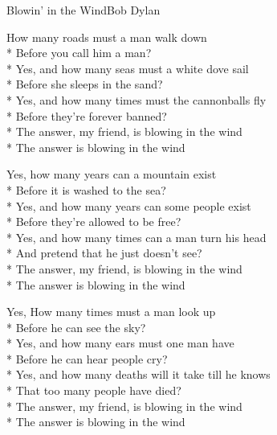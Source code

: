 \documentclass[10.5pt]{book}
\begin{document}
\begin{poem}{Blowin' in the Wind}{Bob Dylan}

\settowidth{\versewidth}{Yes, and how many times must the cannonballs fly}

How many roads must a man walk down\\*
Before you call him a man?\\*
Yes, and how many seas must a white dove sail\\*
Before she sleeps in the sand?\\*
Yes, and how many times must the cannonballs fly\\*
Before they're forever banned?\\*
The answer, my friend, is blowing in the wind\\*
The answer is blowing in the wind

Yes, how many years can a mountain exist\\*
Before it is washed to the sea?\\*
Yes, and how many years can some people exist\\*
Before they're allowed to be free?\\*
Yes, and how many times can a man turn his head\\*
And pretend that he just doesn't see?\\*
The answer, my friend, is blowing in the wind\\*
The answer is blowing in the wind

Yes, How many times must a man look up\\*
Before he can see the sky?\\*
Yes, and how many ears must one man have\\*
Before he can hear people cry?\\*
Yes, and how many deaths will it take till he knows\\*
That too many people have died?\\*
The answer, my friend, is blowing in the wind\\*
The answer is blowing in the wind

\end{poem}
\end{document}
